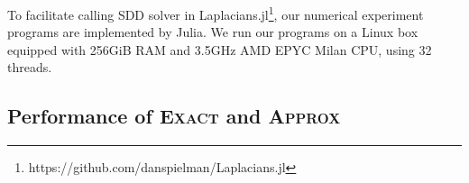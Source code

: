 \documentclass[sigconf]{acmart}
\begin{document}
To facilitate calling SDD solver in Laplacians.jl\footnote{https://github.com/danspielman/Laplacians.jl}, our numerical experiment programs are implemented by Julia.
We run our programs on a Linux box equipped with 256GiB RAM and 3.5GHz AMD EPYC Milan CPU, using 32 threads.





\subsection{Performance of \textsc{Exact} and \textsc{Approx}}
\end{document}
